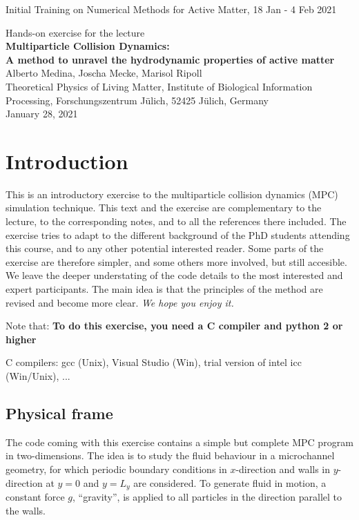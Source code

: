 \documentclass[sizes,12pt,nftimes]{article}
\begin{document}
\begin{center}
{\sc Initial Training on Numerical Methods for Active Matter,} 18 Jan - 4 Feb 2021 

\vspace{1cm}
{\large {\sc Hands-on exercise for the lecture} }\\[1ex]
 
{\large {\bf Multiparticle Collision Dynamics:} } \\ [1ex]
{\large {\bf A method to unravel 
  the hydrodynamic properties of active matter}} \\ [1ex]

Alberto Medina, Joscha Mecke, Marisol Ripoll \\ [1ex]
Theoretical Physics of Living Matter, Institute of Biological Information Processing, 
Forschungszentrum J\"ulich, 52425 J\"ulich, Germany \\[1ex]
January 28, 2021 \\
\end{center}

\section*{Introduction} 
This is an introductory exercise to the multiparticle collision
dynamics (MPC) simulation technique. This text and the exercise are
complementary to the lecture, to the corresponding notes, and to all
the references there included.  The exercise tries to adapt to the
different background of the PhD students attending this course, and to
any other potential interested reader. Some parts of the exercise are
therefore simpler, and some others more involved, but still
accesible. We leave the deeper understating of the code details to the
most interested and expert participants.  The main idea is that the
principles of the method are revised and become more clear. {\em We
  hope you enjoy it.}

\vspace{0.5cm}
Note that: \hspace{0.5cm} {\bf To do this exercise, you need a C compiler
 and python 2 or higher} 

C compilers: gcc (Unix), Visual Studio (Win), trial version of intel icc (Win/Unix), ...

\subsection*{Physical frame}
The code coming with this exercise contains a simple but complete MPC
program in two-dimensions. The idea is to study the fluid behaviour in
a microchannel geometry, for which periodic boundary conditions in
$x$-direction and walls in $y$-direction at $y=0$ and $y=L_y$ are
considered. To generate fluid in motion, a constant force $g$,
``gravity'', is applied to all particles in the direction parallel to
the walls.
\end{document}
